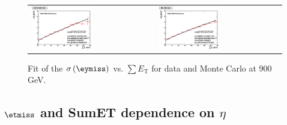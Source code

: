 \begin{figure}[h!]
 \centering
 \begin{tabular}{ll}
  \includegraphics[width=0.5\textwidth]{plots_DataVsMC_MB_900GeV/final_metysigma_sumet_DATA_900.eps} &
  \includegraphics[width=0.5\textwidth]{plots_DataVsMC_MB_900GeV/final_metysigma_sumet_MC_900.eps} \\
 \end{tabular}
 \caption{\small Fit of the $\sigma\left(\eymiss\right)$ vs. $\sum E_\text{T}$ for data and Monte Carlo at $900$ GeV.\label{fig:MEySigma_vs_SumET_900_fit}}
\end{figure}


\clearpage

\subsection{$\etmiss$ and SumET dependence on $\eta$}

